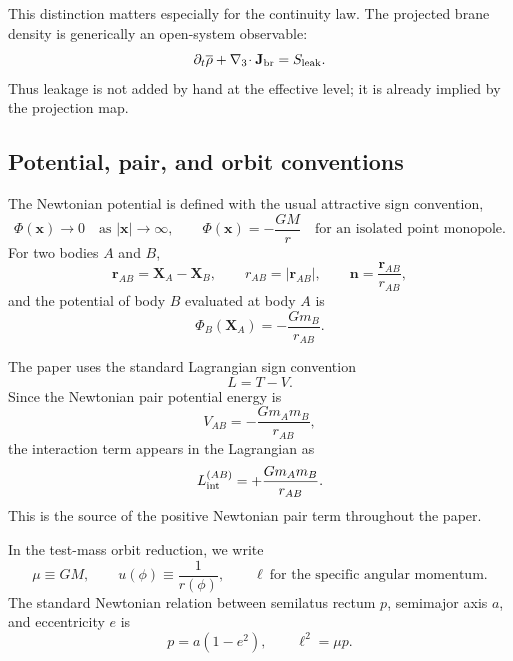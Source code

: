 \documentclass[11pt]{article}
\newcommand{\x}{\mathbf x}
\newcommand{\nvec}{\mathbf n}
\newcommand{\gradThree}{\nabla_3}
\newcommand{\Proj}[1]{\overline{#1}}
\newcommand{\PhiN}{\Phi}
\newcommand{\Sleak}{S_{\mathrm{leak}}}
\begin{document}
This distinction matters especially for the continuity law. The projected brane density is
generically an open-system observable:
\begin{equation}
\partial_t\Proj{\rho}
+
\gradThree\!\cdot\mathbf J_{\rm br}
=
\Sleak.
\label{eq:notation-open-continuity}
\end{equation}
Thus leakage is not added by hand at the effective level; it is already implied by the
projection map.

\subsection{Potential, pair, and orbit conventions}
\label{app:notation-potentials}

The Newtonian potential is defined with the usual attractive sign convention,
\begin{equation}
\PhiN(\x)\to 0 \quad \text{as } |\x|\to\infty,
\qquad
\PhiN(\x)=-\frac{GM}{r}
\quad \text{for an isolated point monopole}.
\label{eq:notation-potential-sign}
\end{equation}
For two bodies \(A\) and \(B\),
\begin{equation}
\mathbf r_{AB}=\mathbf X_A-\mathbf X_B,
\qquad
r_{AB}=|\mathbf r_{AB}|,
\qquad
\nvec=\frac{\mathbf r_{AB}}{r_{AB}},
\label{eq:notation-pair-separation}
\end{equation}
and the potential of body \(B\) evaluated at body \(A\) is
\begin{equation}
\Phi_B(\mathbf X_A)=-\frac{Gm_B}{r_{AB}}.
\label{eq:notation-pair-potential}
\end{equation}

The paper uses the standard Lagrangian sign convention
\begin{equation}
L=T-V.
\label{eq:notation-LTV}
\end{equation}
Since the Newtonian pair potential energy is
\begin{equation}
V_{AB}=-\frac{Gm_A m_B}{r_{AB}},
\end{equation}
the interaction term appears in the Lagrangian as
\begin{equation}
L_{\rm int}^{(AB)}=+\frac{Gm_A m_B}{r_{AB}}.
\label{eq:notation-newtonian-pair-term}
\end{equation}
This is the source of the positive Newtonian pair term throughout the paper.

In the test-mass orbit reduction, we write
\begin{equation}
\mu\equiv GM,
\qquad
u(\phi)\equiv \frac{1}{r(\phi)},
\qquad
\ell \ \text{for the specific angular momentum}.
\label{eq:notation-orbit}
\end{equation}
The standard Newtonian relation between semilatus rectum \(p\), semimajor axis \(a\), and
eccentricity \(e\) is
\begin{equation}
p=a(1-e^2),
\qquad
\ell^2=\mu p.
\label{eq:notation-kepler}
\end{equation}
\end{document}
